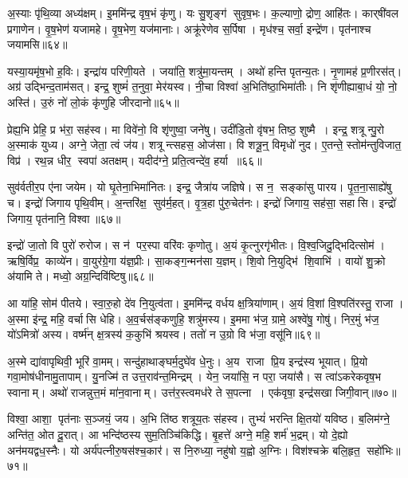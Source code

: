 अ॒स्याः पृ॑थि॒व्या अध्य॑क्षम्।
इ॒ममि॑न्द्र वृष॒भं कृ॑णु।
यः सु॒शृङ्ग॑ सुवृष॒भः।
क॒ल्याणो॒ द्रोण॒ आहि॑तः।
कार्‌षी॑वल प्रगाणेन।
वृ॒ष॒भेण॑ यजामहे।
वृ॒ष॒भेण॒ यज॑मानाः।
अक्रू॑रेणेव स॒र्पिषा।
मृध॑श्च॒ सर्वा॒ इन्द्रे॑ण।
पृत॑नाश्च जयामसि॥६४॥

यस्या॒यमृ॑ष॒भो ह॒विः।
इन्द्रा॑य परिणी॒यते।
जया॑ति॒ शत्रु॑मा॒यन्तम्।
अथो॑ हन्ति पृतन्य॒तः।
नृ॒णामह॑ प्र॒णीरस॑त्।
अग्र॑ उद्भिन्द॒ताम॑सत्।
इन्द्र॒ शुष्मं॑ त॒नुवा॒ मेर॑यस्व।
नी॒चा विश्वा॑ अ॒भिति॑ष्ठा॒भिमा॑तीः।
नि शृ॑णीह्याबा॒धं यो॒ नो॒ अस्ति॑।
उ॒रुं नो॑ लो॒कं कृ॑णुहि जीरदानो॥६५॥

प्रेह्य॒भि प्रेहि॒ प्र भ॑रा॒ सह॑स्व।
मा विवे॑नो॒ वि शृ॑णुष्वा॒ जने॑षु।
उदी॑डि॒तो वृ॑षभ॒ तिष्ठ॒ शुष्मै।
इन्द्र॒ शत्रून्पु॒रो अ॒स्माक॑ युध्य।
अग्ने॒ जेता॒ त्वं ज॑य।
शत्रून्त्सहस॒ ओज॑सा।
वि शत्रू॒न्॒ विमृधो॑ नुद।
ए॒तन्ते॒ स्तोम॑न्तुविजात॒ विप्र॑।
रथ॒न्न धीर॒ स्वपा॑ अतक्षम्।
यदीद॑ग्ने॒ प्रति॒त्वन्दे॑व॒ हर्या॥६६॥

सुव॑र्वतीर॒प ए॑ना जयेम।
यो घृ॒तेना॒भिमा॑नितः।
इन्द्र॒ जैत्रा॑य जज्ञिषे।
स न॒ सङ्का॑सु पारय।
पृ॒त॒ना॒साह्ये॑षु च।
इन्द्रो॑ जिगाय पृथि॒वीम्।
अ॒न्तरि॑क्ष॒ सुव॑र्म॒हत्।
वृ॒त्र॒हा पु॑रु॒चेत॑नः।
इन्द्रो॑ जिगाय॒ सह॑सा॒ सहासि।
इन्द्रो॑ जिगाय॒ पृत॑नानि॒ विश्वा॥६७॥

इन्द्रो॑ जा॒तो वि पुरो॑ रुरोज।
स न॑ पर॒स्पा वरि॑वः कृणोतु।
अ॒यं कृ॒त्नुरगृ॑भीतः।
वि॒श्व॒जिदु॒द्भिदित्सोम॑।
ऋषि॒र्विप्र॒ काव्ये॑न।
वा॒युर॑ग्रे॒गा य॑ज्ञ॒प्रीः।
सा॒कङ्ग॒न्मन॑सा य॒ज्ञम्।
शि॒वो नि॒युद्भि॑ शि॒वाभि॑।
वायो॑ शु॒क्रो अ॑यामि ते।
मध्वो॒ अग्र॒न्दिवि॑ष्टिषु॥६८॥

आ या॑हि॒ सोम॑ पीतये।
स्वा॒रु॒हो दे॑व नि॒युत्व॑ता।
इ॒ममि॑न्द्र वर्धय क्ष॒त्रिया॑णाम्।
अ॒यं वि॒शां वि॒श्पति॑रस्तु॒ राजा।
अ॒स्मा इ॑न्द्र॒ महि॒ वर्चासि धेहि।
अ॒व॒र्चस॑ङ्कणुहि॒ शत्रु॑मस्य।
इ॒ममा भ॑ज॒ ग्रामे॒ अश्वे॑षु॒ गोषु॑।
निर॒मुं भ॑ज॒ यो॑ऽमित्रो॑ अस्य।
वर्ष्म॑न् क्ष॒त्रस्य॑ क॒कुभि॑ श्रयस्व।
ततो॑ न उ॒ग्रो वि भ॑जा॒ वसू॑नि॥६९॥

अ॒स्मे द्या॑वापृथिवी॒ भूरि॑ वा॒मम्।
सन्दु॑हाथाङ्घर्म॒दुघे॑व धे॒नुः।
अ॒य राजा प्रि॒य इन्द्र॑स्य भूयात्।
प्रि॒यो गवा॒मोष॑धीनामु॒तापाम्।
यु॒नज्मि॑ त उत्त॒राव॑न्त॒मिन्द्रम्।
येन॒ जया॑सि॒ न परा॒ जया॑सै।
स त्वा॑ऽकरेकवृष॒भ स्वानाम्।
अथो॑ राजन्नुत्त॒मं मा॑न॒वानाम्।
उत्त॑र॒स्त्वमध॑रे ते स॒पत्ना।
एक॑वृषा॒ इन्द्र॑सखा जिगी॒वान्॥७०॥

विश्वा॒ आशा॒ पृत॑नाः स॒ञ्जयं॒ जय\sn{}।
अ॒भि ति॑ष्ठ शत्रूय॒तः स॑हस्व।
तुभ्यं॑ भरन्ति क्षि॒तयो॑ यविष्ठ।
ब॒लिम॑ग्ने॒ अन्ति॑त॒ ओत दू॒रात्।
आ भन्दि॑ष्ठस्य सुम॒तिञ्चि॑किद्धि।
बृ॒हत्ते॑ अग्ने॒ महि॒ शर्म॑ भ॒द्रम्।
यो दे॒ह्यो अन॑मयद्वध॒स्नैः।
यो अर्य॑पत्नीरु॒षस॑श्च॒कार॑।
स नि॒रुध्या॒ नहु॑षो य॒ह्वो अ॒ग्निः।
विश॑श्चक्रे बलि॒हृत॒ सहो॑भिः॥७१॥

